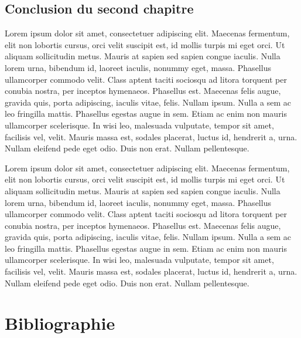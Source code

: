 \documentclass{article}
\begin{document}
\section{Conclusion du second chapitre}


Lorem ipsum dolor sit amet, consectetuer adipiscing elit. Maecenas fermentum, elit non lobortis cursus, orci velit suscipit est, id mollis turpis mi eget orci. Ut aliquam sollicitudin metus. Mauris at sapien sed sapien congue iaculis. Nulla lorem urna, bibendum id, laoreet iaculis, nonummy eget, massa. Phasellus ullamcorper commodo velit. Class aptent taciti sociosqu ad litora torquent per conubia nostra, per inceptos hymenaeos. Phasellus est. Maecenas felis augue, gravida quis, porta adipiscing, iaculis vitae, felis. Nullam ipsum. Nulla a sem ac leo fringilla mattis. Phasellus egestas augue in sem. Etiam ac enim non mauris ullamcorper scelerisque. In wisi leo, malesuada vulputate, tempor sit amet, facilisis vel, velit. Mauris massa est, sodales placerat, luctus id, hendrerit a, urna. Nullam eleifend pede eget odio. Duis non erat. Nullam pellentesque.

Lorem ipsum dolor sit amet, consectetuer adipiscing elit. Maecenas fermentum, elit non lobortis cursus, orci velit suscipit est, id mollis turpis mi eget orci. Ut aliquam sollicitudin metus. Mauris at sapien sed sapien congue iaculis. Nulla lorem urna, bibendum id, laoreet iaculis, nonummy eget, massa. Phasellus ullamcorper commodo velit. Class aptent taciti sociosqu ad litora torquent per conubia nostra, per inceptos hymenaeos. Phasellus est. Maecenas felis augue, gravida quis, porta adipiscing, iaculis vitae, felis. Nullam ipsum. Nulla a sem ac leo fringilla mattis. Phasellus egestas augue in sem. Etiam ac enim non mauris ullamcorper scelerisque. In wisi leo, malesuada vulputate, tempor sit amet, facilisis vel, velit. Mauris massa est, sodales placerat, luctus id, hendrerit a, urna. Nullam eleifend pede eget odio. Duis non erat. Nullam pellentesque.

\clearemptydoublepage


\clearemptydoublepage
\chapter*{Bibliographie}


\nocite{*} %
\printbibliography[heading=primary,keyword=primary]
\newpage
\nocite{*}
\printbibliography[heading=secondary,keyword=secondary]

\newpage
\clearemptydoublepage
\end{document}
